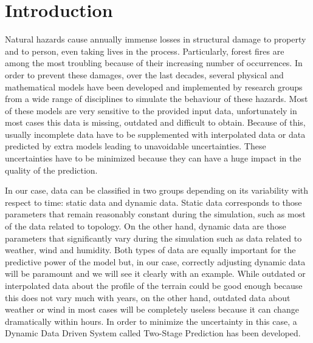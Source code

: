 \section{Introduction}\label{sec:intro}

Natural hazards cause annually immense losses in structural damage to property and to person, even taking lives in the process. Particularly, forest fires are among the most troubling because of their increasing number of occurrences. In order to prevent these damages, over the last decades, several physical and mathematical models have been developed and implemented by research groups from a wide range of disciplines to simulate the behaviour of these hazards. Most of these models are very sensitive to the provided input data, unfortunately in most cases this data is missing, outdated and difficult to obtain. Because of this, usually incomplete data have to be supplemented with interpolated data or data predicted by extra models leading to unavoidable uncertainties. These uncertainties have to be minimized because they can have a huge impact in the quality of the prediction.

In our case, data can be classified in two groups depending on its variability with respect to time: static data and dynamic data. Static data corresponds to those parameters that remain reasonably constant during the simulation, such as most of the data related to topology. On the other hand, dynamic data are those parameters that significantly vary during the simulation such as data related to weather, wind and humidity. Both types of data are equally important for the predictive power of the model but, in our case, correctly adjusting dynamic data will be paramount and we will see it clearly with an example. While outdated or interpolated data about the profile of the terrain could be good enough because this does not vary much with years, on the other hand, outdated data about weather or wind in most cases will be completely useless because it can change dramatically within hours. In order to minimize the uncertainty in this case, a Dynamic Data Driven System called Two-Stage Prediction has been developed.

